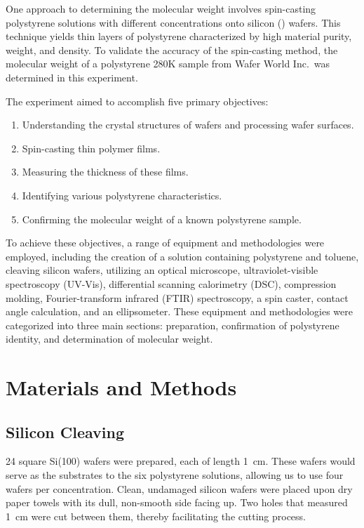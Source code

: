 \documentclass[twocolumn]{article}
\begin{document}
        One approach to determining the molecular weight involves spin-casting polystyrene solutions with different concentrations onto silicon () wafers. This technique yields thin layers of polystyrene characterized by high material purity, weight, and density\autocite{WOS:Dinelli}. To validate the accuracy of the spin-casting method, the molecular weight of a polystyrene 280K sample from Wafer World Inc.\ was determined in this experiment.
        
        The experiment aimed to accomplish five primary objectives:
        \begin{enumerate}
            \item Understanding the crystal structures of  wafers and processing  wafer surfaces.
            \item Spin-casting thin polymer films.
            \item Measuring the thickness of these films.
            \item Identifying various polystyrene characteristics.
            \item Confirming the molecular weight of a known polystyrene sample. 
        \end{enumerate}

        To achieve these objectives, a range of equipment and methodologies were employed, including the creation of a solution containing polystyrene and toluene, cleaving silicon wafers, utilizing an optical microscope, ultraviolet-visible spectroscopy (UV-Vis), differential scanning calorimetry (DSC), compression molding, Fourier-transform infrared (FTIR) spectroscopy, a spin caster, contact angle calculation, and an ellipsometer. These equipment and methodologies were categorized into three main sections: preparation, confirmation of polystyrene identity, and determination of molecular weight. 
        
        \section{Materials and Methods}
            \subsection{Silicon Cleaving}
            24 square Si(100) wafers were prepared, each of length \qty{1}{\centi\meter}. These wafers would serve as the substrates to the six polystyrene solutions, allowing us to use four wafers per concentration. Clean, undamaged silicon wafers were placed upon dry paper towels with its dull, non-smooth side facing up. Two holes that measured \qty{1}{\centi\meter} were cut between them, thereby facilitating the cutting process.
            
\end{document}
